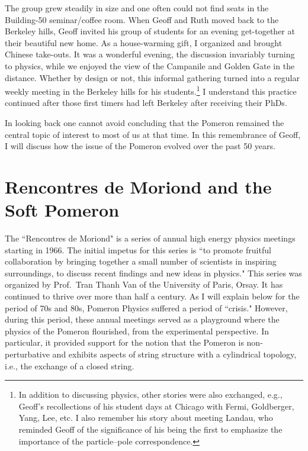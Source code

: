 \documentclass[11pt, oneside]{article}   	%
\newcommand{\<}{\langle}
\renewcommand{\>}{\rangle}
\numberwithin{equation}{section}
\numberwithin{figure}{section}
\begin{document}
The group grew steadily in size and one often could not find seats in the Building-50 seminar/coffee room.
When Geoff and Ruth moved back to the Berkeley hills, Geoff invited his group of students for an evening get-together at their beautiful new home. As a house-warming gift, I organized and brought Chinese take-outs.  It was a wonderful evening, the discussion invariably turning to physics, while we enjoyed the view of the Campanile and Golden Gate in the distance. 
 Whether by design or not, this informal gathering turned into a regular weekly meeting in the Berkeley hills for his students.\footnote{In addition to  discussing physics, other stories were also exchanged, e.g., Geoff's recollections of his student days at Chicago with Fermi, Goldberger, Yang, Lee, etc. I also remember his story about meeting Landau, who reminded Geoff of the significance of his being the first to emphasize the importance of the particle--pole correspondence.} I understand this practice continued after those first timers had left Berkeley after receiving their PhDs.

In looking back one cannot avoid concluding that the Pomeron remained the central topic of interest to most of us at that time.  In this remembrance of Geoff, I will discuss how the issue of the Pomeron evolved over the past 50 years. 



\section{Rencontres de Moriond and the Soft Pomeron}

The ``Rencontres de Moriond"  is a series of annual high energy physics meetings starting in 1966. The initial impetus for this series is ``to promote fruitful collaboration by bringing together a small number of scientists in inspiring surroundings, to discuss recent findings and new ideas in physics."
This series was  organized by Prof.~Tran Thanh Van of the University of Paris, Orsay.  It  has continued to thrive over more than half a century. As I will explain below for the period of 70s and 80s, Pomeron Physics  suffered a period of ``crisis." However, during this period, these annual meetings  served as a playground where the physics of the Pomeron flourished, from the experimental perspective. In particular, it provided support for the notion that the Pomeron is non-perturbative and exhibits aspects of string structure with a cylindrical topology, i.e., the exchange of a closed string.
\end{document}
